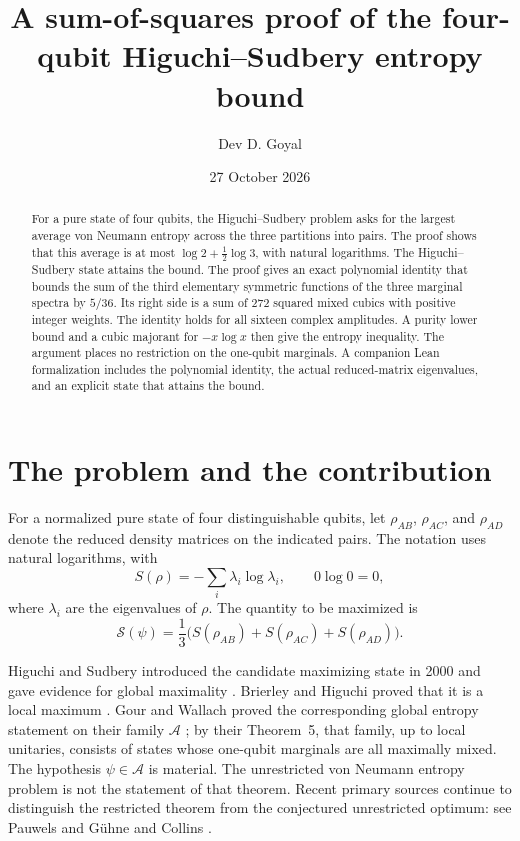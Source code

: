 \documentclass[11pt]{article}
\title{A sum-of-squares proof of the four-qubit\newline
Higuchi--Sudbery entropy bound}
\author{Dev D. Goyal}
\date{27 October 2026}
\theoremstyle{definition}
\theoremstyle{remark}
\begin{document}
\maketitle

\begin{abstract}
For a pure state of four qubits, the Higuchi--Sudbery problem asks for the largest average von Neumann entropy across the three partitions into pairs. The proof shows that this average is at most $\log2+\tfrac12\log3$, with natural logarithms. The Higuchi--Sudbery state attains the bound. The proof gives an exact polynomial identity that bounds the sum of the third elementary symmetric functions of the three marginal spectra by $5/36$. Its right side is a sum of 272 squared mixed cubics with positive integer weights. The identity holds for all sixteen complex amplitudes. A purity lower bound and a cubic majorant for $-x\log x$ then give the entropy inequality. The argument places no restriction on the one-qubit marginals. A companion Lean formalization includes the polynomial identity, the actual reduced-matrix eigenvalues, and an explicit state that attains the bound.
\end{abstract}

\section{The problem and the contribution}

For a normalized pure state of four distinguishable qubits, let
$\rho_{AB}$, $\rho_{AC}$, and $\rho_{AD}$ denote the reduced density
matrices on the indicated pairs. The notation uses natural logarithms, with
\[
 S(\rho)=-\sum_i\lambda_i\log\lambda_i,
 \qquad 0\log0=0,
\]
where $\lambda_i$ are the eigenvalues of $\rho$. The quantity to be
maximized is
\begin{equation}
 \mathcal S(\psi)=\frac13\bigl(S(\rho_{AB})+S(\rho_{AC})+S(\rho_{AD})\bigr).
 \label{eq:objective}
\end{equation}

Higuchi and Sudbery introduced the candidate maximizing state in 2000 and
gave evidence for global maximality \cite{HS00}. Brierley and Higuchi
proved that it is a local maximum \cite{BH07}. Gour and Wallach proved the
corresponding global entropy statement on their family $\mathcal A$
\cite[Theorem~10(a)]{GW10}; by their Theorem~5, that family, up to local
unitaries, consists of states whose one-qubit marginals are all maximally
mixed. The hypothesis $\psi\in\mathcal A$ is material. The unrestricted
von Neumann entropy problem is not the statement of that theorem.
Recent primary sources continue to distinguish the restricted theorem
from the conjectured unrestricted optimum: see Pauwels and G\"uhne
\cite[Section~IV.2 and Appendix~A]{PG26} and Collins
\cite[Section~3.2]{C26}.
\end{document}
